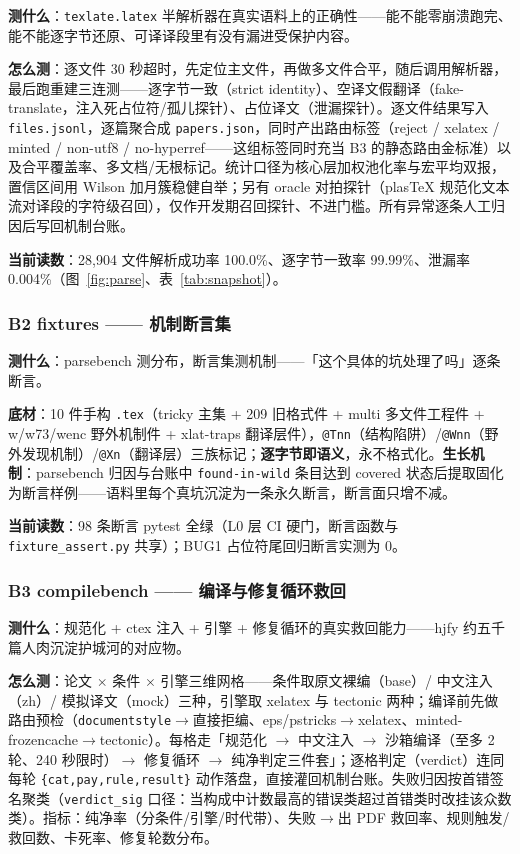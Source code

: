 \textbf{测什么}：\texttt{texlate.latex} 半解析器在真实语料上的正确性——能不能零崩溃跑完、能不能逐字节还原、可译译段里有没有漏进受保护内容。

\textbf{怎么测}：逐文件 30 秒超时，先定位主文件，再做多文件合平，随后调用解析器，最后跑重建三连测——逐字节一致（strict identity）、空译文假翻译（fake-translate，注入死占位符/孤儿探针）、占位译文（泄漏探针）。逐文件结果写入 \texttt{files.jsonl}，逐篇聚合成 \texttt{papers.json}，同时产出路由标签（reject / xelatex / minted / non-utf8 / no-hyperref——这组标签同时充当 B3 的静态路由金标准）以及合平覆盖率、多文档/无根标记。统计口径为核心层加权池化率与宏平均双报，置信区间用 Wilson 加月簇稳健自举；另有 oracle 对拍探针（plasTeX 规范化文本流对译段的字符级召回），仅作开发期召回探针、不进门槛。所有异常逐条人工归因后写回机制台账。

\textbf{当前读数}：28{,}904 文件解析成功率 100.0\%、逐字节一致率 99.99\%、泄漏率 0.004\%（图~\ref{fig:parse}、表~\ref{tab:snapshot}）。

\subsubsection{B2 fixtures —— 机制断言集}

\textbf{测什么}：parsebench 测分布，断言集测机制——「这个具体的坑处理了吗」逐条断言。

\textbf{底材}：10 件手构 \texttt{.tex}（tricky 主集 + 209 旧格式件 + multi 多文件工程件 + w/w73/wenc 野外机制件 + xlat-traps 翻译层件），\texttt{@Tnn}（结构陷阱）/\texttt{@Wnn}（野外发现机制）/\texttt{@Xn}（翻译层）三族标记；\textbf{逐字节即语义}，永不格式化。\textbf{生长机制}：parsebench 归因与台账中 \texttt{found-in-wild} 条目达到 covered 状态后提取固化为断言样例——语料里每个真坑沉淀为一条永久断言，断言面只增不减。

\textbf{当前读数}：98 条断言 pytest 全绿（L0 层 CI 硬门，断言函数与 \texttt{fixture\_assert.py} 共享）；BUG1 占位符尾回归断言实测为 0。

\subsubsection{B3 compilebench —— 编译与修复循环救回}

\textbf{测什么}：规范化 + ctex 注入 + 引擎 + 修复循环的真实救回能力——hjfy 约五千篇人肉沉淀护城河的对应物。

\textbf{怎么测}：论文 $\times$ 条件 $\times$ 引擎三维网格——条件取原文裸编（base）/ 中文注入（zh）/ 模拟译文（mock）三种，引擎取 xelatex 与 tectonic 两种；编译前先做路由预检（\texttt{documentstyle}$\to$直接拒编、eps/pstricks$\to$xelatex、minted-frozencache$\to$tectonic）。每格走「规范化 $\to$ 中文注入 $\to$ 沙箱编译（至多 2 轮、240 秒限时）$\to$ 修复循环 $\to$ 纯净判定三件套」；逐格判定（verdict）连同每轮 \texttt{\{cat,pay,rule,result\}} 动作落盘，直接灌回机制台账。失败归因按首错签名聚类（\texttt{verdict\_sig} 口径：当构成中计数最高的错误类超过首错类时改挂该众数类）。指标：纯净率（分条件/引擎/时代带）、失败$\to$出 PDF 救回率、规则触发/救回数、卡死率、修复轮数分布。

